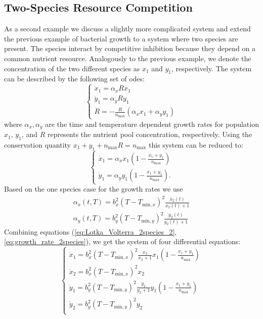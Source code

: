 \documentclass[10pt,A4paper]{article}
\begin{document}
\subsection*{Two-Species Resource Competition}
As a second example we discuss a slightly more complicated system and extend the previous example of bacterial growth to a system where two species are present.
The species interact by competitive inhibition because they depend on a common nutrient resource.
Analogously to the previous example, we denote the concentration of the two different species as $x_1$ and $y_1$, respectively.
The system can be described by the following set of \acp{ode}:
\begin{equation}
    \begin{cases}
        \dot x_1 = \alpha_x R x_1 \\
        \dot y_1 = \alpha_y R y_1 \\
        \dot R = -\frac{R}{n_\text{max}}(\alpha_x x_1+\alpha_y y_1)
    \end{cases}
    \label{eq:Lotka_Volterra_2species_1}
\end{equation}
where $\alpha_x, \alpha_y$ are the time and temperature dependent growth rates for population $x_1$, $y_1$, and $R$ represents the nutrient pool concentration, respectively.
Using the conservation quantity $x_1 + y_1 + n_\text{max}R = n_\text{max}$ this system can be reduced to:
\begin{equation}
    \begin{cases}
        \dot x_1 = \alpha_x x_1\left(1-\frac{x_1+y_1}{n_\text{max}}\right) \\
        \dot y_1 = \alpha_y y_1\left(1-\frac{x_1+y_1}{n_\text{max}}\right).
    \end{cases}
    \label{eq:Lotka_Volterra_2species_2}
\end{equation}
Based on the one species case for the growth rates we use \cite{baranyiDynamicApproach1994,ratkowsky_relationship_1982}
\begin{eqnarray}
    \alpha_x (t, T) = b_x^2 (T - T_{\text{min}, x})^2 \frac{x_2(t)}{x_2(t) + 1}\\
    \alpha_y (t, T) = b_y^2 (T - T_{\text{min}, y})^2 \frac{y_2(t)}{y_2(t) + 1}
    \label{eq:growth_rate_2species}
\end{eqnarray}
Combining equations (\ref{eq:Lotka_Volterra_2species_2}, \ref{eq:growth_rate_2species}), we get the system of four differential equations:
\begin{equation}
    \begin{cases}
        \dot x_1 = b_x^2 (T - T_{\text{min}, x})^2 \frac{x_2}{x_2 + 1} x_1 (1 - \frac{x_1 + y_1}{n_\text{max}})\\
        \dot x_2 = b_x^2 (T - T_{\text{min}, x})^2 x_2 \\
        \dot y_1 = b_y^2 (T - T_{\text{min}, y})^2 \frac{y_2}{y_2 + 1} y_1 (1 - \frac{x_1 + y_1}{n_\text{max}})\\
        \dot y_2 = b_y^2 (T - T_{\text{min}, y})^2 y_2 \\
    \end{cases}
    \label{eq:model_2species_resource}
\end{equation}
\end{document}
